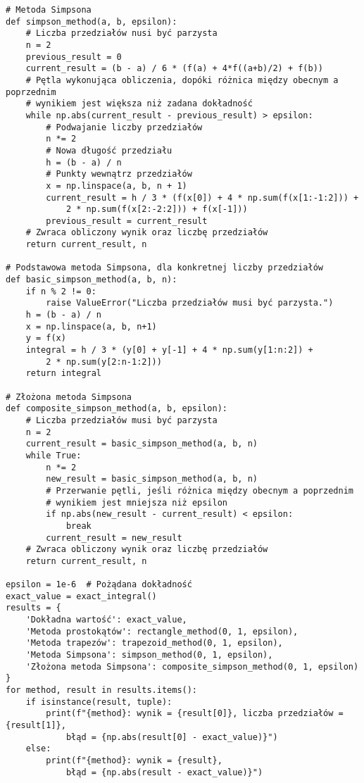 \documentclass[10pt]{article}
\begin{document}
\begin{adjustwidth}{-1.5cm}{-1.5cm}
\begin{enumerate}
\begin{verbatim}
# Metoda Simpsona
def simpson_method(a, b, epsilon):  
    # Liczba przedziałów nusi być parzysta
    n = 2  
    previous_result = 0 
    current_result = (b - a) / 6 * (f(a) + 4*f((a+b)/2) + f(b)) 
    # Pętla wykonująca obliczenia, dopóki różnica między obecnym a poprzednim
    # wynikiem jest większa niż zadana dokładność
    while np.abs(current_result - previous_result) > epsilon:  
        # Podwajanie liczby przedziałów
        n *= 2  
        # Nowa długość przedziału
        h = (b - a) / n  
        # Punkty wewnątrz przedziałów
        x = np.linspace(a, b, n + 1) 
        current_result = h / 3 * (f(x[0]) + 4 * np.sum(f(x[1:-1:2])) + 
            2 * np.sum(f(x[2:-2:2])) + f(x[-1]))
        previous_result = current_result  
    # Zwraca obliczony wynik oraz liczbę przedziałów
    return current_result, n 
    
# Podstawowa metoda Simpsona, dla konkretnej liczby przedziałów
def basic_simpson_method(a, b, n):  
    if n % 2 != 0:  
        raise ValueError("Liczba przedziałów musi być parzysta.")
    h = (b - a) / n 
    x = np.linspace(a, b, n+1) 
    y = f(x)  
    integral = h / 3 * (y[0] + y[-1] + 4 * np.sum(y[1:n:2]) + 
        2 * np.sum(y[2:n-1:2]))  
    return integral 

# Złożona metoda Simpsona
def composite_simpson_method(a, b, epsilon): 
    # Liczba przedziałów musi być parzysta
    n = 2  
    current_result = basic_simpson_method(a, b, n)  
    while True:
        n *= 2  
        new_result = basic_simpson_method(a, b, n)  
        # Przerwanie pętli, jeśli różnica między obecnym a poprzednim 
        # wynikiem jest mniejsza niż epsilon
        if np.abs(new_result - current_result) < epsilon:  
            break  
        current_result = new_result 
    # Zwraca obliczony wynik oraz liczbę przedziałów
    return current_result, n  
    
epsilon = 1e-6  # Pożądana dokładność
exact_value = exact_integral()  
results = { 
    'Dokładna wartość': exact_value,
    'Metoda prostokątów': rectangle_method(0, 1, epsilon),
    'Metoda trapezów': trapezoid_method(0, 1, epsilon),
    'Metoda Simpsona': simpson_method(0, 1, epsilon),
    'Złożona metoda Simpsona': composite_simpson_method(0, 1, epsilon)
}
for method, result in results.items():  
    if isinstance(result, tuple):  
        print(f"{method}: wynik = {result[0]}, liczba przedziałów = {result[1]},
            błąd = {np.abs(result[0] - exact_value)}")  
    else: 
        print(f"{method}: wynik = {result}, 
            błąd = {np.abs(result - exact_value)}") 



\end{verbatim}
\end{enumerate}
\end{adjustwidth}
\end{document}
